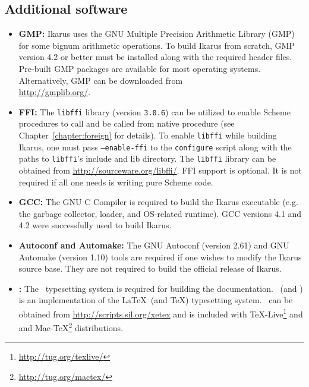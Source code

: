 \documentclass[onecolumn, 12pt, twoside, openright, dvipdfm]{book}
\begin{document}
\subsection{Additional software}

\begin{itemize}
\item\textbf{GMP:} Ikarus uses the GNU Multiple Precision Arithmetic
Library (GMP) for some bignum arithmetic operations.  To build
Ikarus from scratch, GMP version 4.2 or better must be installed
along with the required header files.  Pre-built GMP packages  are
available for most operating systems.  Alternatively, GMP can be
downloaded from \\
\url{http://gmplib.org/}.


\item\textbf{FFI:} 
 The \texttt{libffi} library (version \texttt{3.0.6}) can be utilized 
to enable Scheme procedures to call and be called from native
procedure (see Chapter~\ref{chapter:foreign} for details).  
To enable
\texttt{libffi} while building Ikarus, one must pass
\texttt{--enable-ffi} to the \texttt{configure} script along with
the paths to \texttt{libffi}'s include and lib directory.
The \texttt{libffi} library can be obtained from
\url{http://sourceware.org/libffi/}.
FFI support is optional.  It is not required if all one needs is
writing pure Scheme code.




\item\textbf{GCC:} The GNU C Compiler is required to build the Ikarus
executable (e.g. the garbage collector, loader, and OS-related
runtime).  GCC versions 4.1 and 4.2 were successfully used to build
Ikarus.

\item\textbf{Autoconf and Automake:} The GNU Autoconf (version 2.61)
and GNU Automake (version 1.10) tools are required if one
wishes to modify the Ikarus source base.  They are not
required to build the official release of Ikarus.

\item\textbf{\XeLaTeX{}:}  The \XeLaTeX\ typesetting system is
required for building the documentation.  \XeLaTeX\ (and \XeTeX) is
an implementation of the \LaTeX\ (and \TeX) typesetting system.
\XeLaTeX\ can be obtained from \url{http://scripts.sil.org/xetex}
and is included with \TeX-Live\footnote{
\url{http://tug.org/texlive/}} and and
Mac-\TeX\footnote{\url{http://tug.org/mactex/}} distributions.


\end{itemize}
\end{document}
